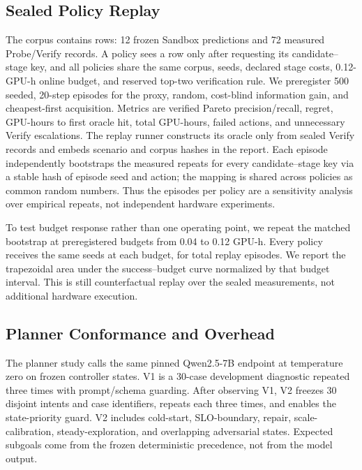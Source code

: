 \subsection{Sealed Policy Replay}

The corpus contains \ConfigurationReplayRows{} rows: 12 frozen Sandbox
predictions and 72 measured Probe/Verify records.  A policy sees a row only
after requesting its candidate--stage key, and all policies share the same
corpus, seeds, declared stage costs, 0.12-GPU-h online budget, and reserved
top-two verification rule.
We preregister 500 seeded, 20-step episodes for the \ipig{} proxy, random,
cost-blind information gain, and cheapest-first acquisition.  Metrics are
verified Pareto precision/recall, regret, GPU-hours to first oracle hit, total
GPU-hours, failed actions, and unnecessary Verify escalations.  The replay runner
constructs its oracle only from sealed Verify records and embeds scenario and corpus
hashes in the report.  Each episode independently bootstraps the
\PolicyHardwareRepeats{} measured repeats for every candidate--stage key via
a stable hash of episode seed and action; the mapping is shared across policies
as common random numbers.  Thus the \PolicyEpisodes{} episodes per policy are a
sensitivity analysis over empirical repeats, not \PolicyEpisodes{} independent
hardware experiments.

To test budget response rather than one operating point, we repeat the matched
bootstrap at \BudgetLevels{} preregistered budgets from 0.04 to 0.12 GPU-h.
Every policy receives the same \BudgetEpisodesPerPoint{} seeds at each budget,
for \BudgetTotalEpisodes{} total replay episodes.  We report the trapezoidal
area under the success--budget curve normalized by that budget interval.  This
is still counterfactual replay over the sealed measurements, not additional
hardware execution.

\subsection{Planner Conformance and Overhead}

The planner study calls the same pinned Qwen2.5-7B endpoint at temperature zero
on frozen controller states.  V1 is a 30-case development diagnostic repeated
three times with prompt/schema guarding.  After observing V1, V2 freezes 30
disjoint intents and case identifiers, repeats each three times, and enables the
state-priority guard.  V2 includes cold-start, SLO-boundary, repair,
scale-calibration, steady-exploration, and overlapping adversarial states.
Expected subgoals come from the frozen deterministic precedence, not from the
model output.

